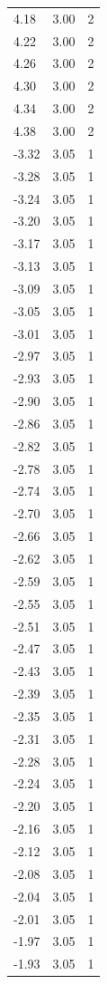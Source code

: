 \begin{longtable}{lrr}
  4.18 & 3.00 & 2 \\
  4.22 & 3.00 & 2 \\
  4.26 & 3.00 & 2 \\
  4.30 & 3.00 & 2 \\
  4.34 & 3.00 & 2 \\
  4.38 & 3.00 & 2 \\
  -3.32 & 3.05 & 1 \\
  -3.28 & 3.05 & 1 \\
  -3.24 & 3.05 & 1 \\
  -3.20 & 3.05 & 1 \\
  -3.17 & 3.05 & 1 \\
  -3.13 & 3.05 & 1 \\
  -3.09 & 3.05 & 1 \\
  -3.05 & 3.05 & 1 \\
  -3.01 & 3.05 & 1 \\
  -2.97 & 3.05 & 1 \\
  -2.93 & 3.05 & 1 \\
  -2.90 & 3.05 & 1 \\
  -2.86 & 3.05 & 1 \\
  -2.82 & 3.05 & 1 \\
  -2.78 & 3.05 & 1 \\
  -2.74 & 3.05 & 1 \\
  -2.70 & 3.05 & 1 \\
  -2.66 & 3.05 & 1 \\
  -2.62 & 3.05 & 1 \\
  -2.59 & 3.05 & 1 \\
  -2.55 & 3.05 & 1 \\
  -2.51 & 3.05 & 1 \\
  -2.47 & 3.05 & 1 \\
  -2.43 & 3.05 & 1 \\
  -2.39 & 3.05 & 1 \\
  -2.35 & 3.05 & 1 \\
  -2.31 & 3.05 & 1 \\
  -2.28 & 3.05 & 1 \\
  -2.24 & 3.05 & 1 \\
  -2.20 & 3.05 & 1 \\
  -2.16 & 3.05 & 1 \\
  -2.12 & 3.05 & 1 \\
  -2.08 & 3.05 & 1 \\
  -2.04 & 3.05 & 1 \\
  -2.01 & 3.05 & 1 \\
  -1.97 & 3.05 & 1 \\
  -1.93 & 3.05 & 1 \\

\end{longtable}
